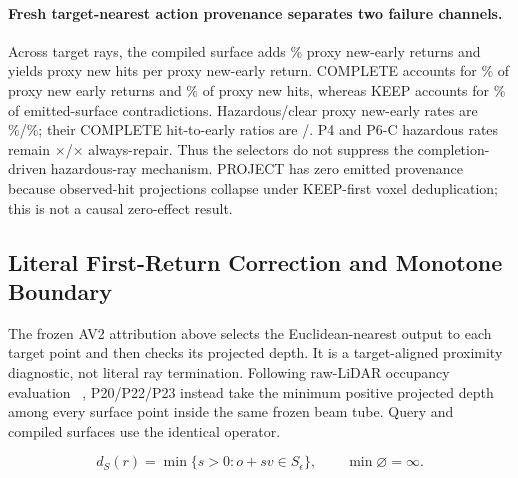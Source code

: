 \paragraph{Fresh target-nearest action provenance separates two failure channels.}
Across \PfifteenFreshRays{} target rays, the compiled surface adds \PfifteenNewEarlyRate{}\% proxy new-early returns and yields
\PfifteenNewHitEarlyRatio{} proxy new hits per proxy new-early return. COMPLETE accounts for \PfifteenCompleteNewEarlyShare{}\% of proxy new
early returns and \PfifteenCompleteNewHitShare{}\% of proxy new hits, whereas KEEP accounts for
\PfifteenKeepContradictionShare{}\% of emitted-surface contradictions. Hazardous/clear proxy new-early rates are
\PfifteenHazardNewEarlyRate{}\%/\PfifteenClearNewEarlyRate{}\%; their COMPLETE hit-to-early ratios are
\PfifteenHazardCompleteHitEarly{}/\PfifteenClearCompleteHitEarly{}. P4 and P6-C hazardous rates remain
\PfifteenPfourHazardVsAlways{}$\times$/\PfifteenPsixHazardVsAlways{}$\times$ always-repair. Thus the selectors do not
suppress the completion-driven hazardous-ray mechanism. PROJECT has zero emitted provenance because observed-hit projections
collapse under KEEP-first voxel deduplication; this is not a causal zero-effect result.

\subsection{Literal First-Return Correction and Monotone Boundary}

The frozen AV2 attribution above selects the Euclidean-nearest output to each target point and then checks its projected depth. It
is a target-aligned proximity diagnostic, not literal ray termination. Following raw-LiDAR occupancy evaluation
~\cite{kalble2024accurate}, P20/P22/P23 instead take the minimum positive projected depth among every surface point inside the same frozen
beam tube. Query and compiled surfaces use the identical operator.

\begin{equation}
d_S(r)=\min\{s>0:o+sv\in S_{\epsilon}\},\qquad \min\varnothing=\infty.
\label{legacy:eq:supp-first-return}
\end{equation}

